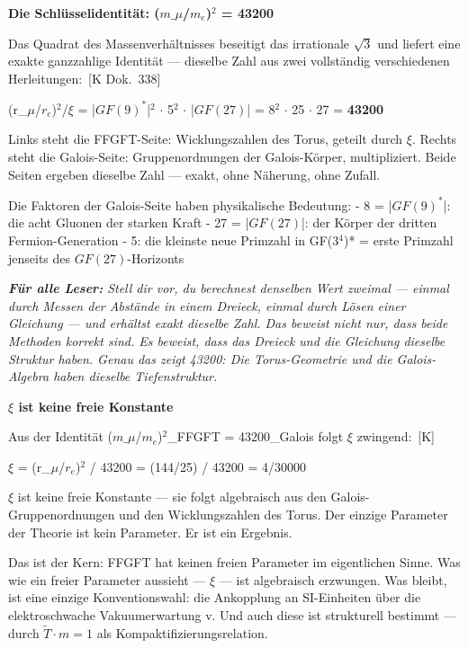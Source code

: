 \documentclass[11pt,oneside]{book}
\newcommand{\status}[1]{\penalty10000\,{\scriptsize\textcolor{gray!60}{[#1]}}}
\newenvironment{laierspur}{%
  \par\vspace{4pt}%
  \noindent\small\itshape\color{blue!60!black}%
  \textbf{Für alle Leser:}\enspace\ignorespaces}{%
  \par\vspace{4pt}\normalsize\normalfont\normalcolor}
\begin{document}
\textbf{Die Schlüsselidentität: ($m\_\mu$/$m_e$)$^2$ = 43200}


Das Quadrat des Massenverhältnisses beseitigt das irrationale $\sqrt{3}$ und
liefert eine exakte ganzzahlige Identität — dieselbe Zahl aus zwei
vollständig verschiedenen Herleitungen: \status{K Dok.~338}


(r\_$\mu$/$r_e$)$^2$/$\xi$ = |$GF(9)^*$|$^2$ $\cdot$ 5$^2$ $\cdot$ |$GF(27)$| = 8$^2$ $\cdot$ 25 $\cdot$ 27 = \textbf{43200}


Links steht die FFGFT-Seite: Wicklungszahlen des Torus, geteilt durch $\xi$.
Rechts steht die Galois-Seite: Gruppenordnungen der Galois-Körper,
multipliziert. Beide Seiten ergeben dieselbe Zahl — exakt, ohne Näherung,
ohne Zufall.


Die Faktoren der Galois-Seite haben physikalische Bedeutung:
- 8 = |$GF(9)^*$|: die acht Gluonen der starken Kraft
- 27 = |$GF(27)$|: der Körper der dritten Fermion-Generation
- 5: die kleinste neue Primzahl in GF(3$^4$)* = erste Primzahl jenseits des
  $GF(27)$-Horizonts


\begin{laierspur}
Stell dir vor, du berechnest denselben Wert zweimal —
einmal durch Messen der Abstände in einem Dreieck, einmal durch
Lösen einer Gleichung — und erhältst exakt dieselbe Zahl. Das beweist
nicht nur, dass beide Methoden korrekt sind. Es beweist, dass das
Dreieck und die Gleichung dieselbe Struktur haben. Genau das zeigt
43200: Die Torus-Geometrie und die Galois-Algebra haben dieselbe
Tiefenstruktur.
\end{laierspur}

\textbf{$\xi$ ist keine freie Konstante}


Aus der Identität ($m\_\mu$/$m_e$)$^2$\_FFGFT = 43200\_Galois folgt $\xi$ zwingend: \status{K}


$\xi$ = (r\_$\mu$/$r_e$)$^2$ / 43200 = (144/25) / 43200 = 4/30000


$\xi$ ist keine freie Konstante — sie folgt algebraisch aus den
Galois-Gruppenordnungen und den Wicklungszahlen des Torus. Der einzige
Parameter der Theorie ist kein Parameter. Er ist ein Ergebnis.


Das ist der Kern: FFGFT hat keinen freien Parameter im eigentlichen Sinne.
Was wie ein freier Parameter aussieht — $\xi$ — ist algebraisch erzwungen.
Was bleibt, ist eine einzige Konventionswahl: die Ankopplung an SI-Einheiten
über die elektroschwache Vakuumerwartung v. Und auch diese ist strukturell
bestimmt — durch $\tilde{T}\cdot m = 1$ als Kompaktifizierungsrelation.
\end{document}
